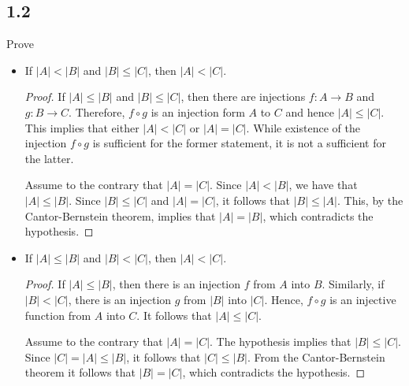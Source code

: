 \subsection*{1.2} Prove

\begin{itemize}
    \item If $|A| < |B|$ and $|B| \leq |C|$, then $|A| < |C|$. 
    
    \begin{proof}
    If $|A| \leq |B|$ and $|B| \leq |C|$, then there are injections $f:A \rightarrow B$ and $g:B \rightarrow C$. Therefore, $f \circ g$ is an injection form $A$ to $C$ and hence $|A| \leq |C|$. This implies that either $|A| < |C|$ or $|A| = |C|$. While existence of the injection $f \circ g$ is sufficient for the former statement, it is not a sufficient for the latter.
    
    Assume to the contrary that $|A| = |C|$. Since $|A| < |B|$, we have that $|A| \leq |B|$. Since $|B| \leq |C|$ and $|A| = |C|$, it follows that $|B| \leq |A|$. 
    This, by the Cantor-Bernstein theorem, implies that $|A| = |B|$, which contradicts the hypothesis.
    \end{proof}
    
    \item If $|A| \leq |B|$ and $|B| < |C|$, then $|A| < |C|$. 
    
    \begin{proof}
    If $|A| \leq |B|$, then there is an injection $f$ from $A$ into $B$. Similarly, if $|B| < |C|$, there is an injection $g$ from $|B|$ into $|C|$. Hence, $f \circ g$ is an injective function from $A$ into $C$. It follows that $|A| \leq |C|$.
    
    Assume to the contrary that $|A| = |C|$. The hypothesis implies that $|B| \leq |C|$. Since $|C| = |A| \leq |B|$, it follows that $|C| \leq |B|$. From the Cantor-Bernstein theorem it follows that $|B| = |C|$, which contradicts the hypothesis.
    \end{proof}
    
\end{itemize}

